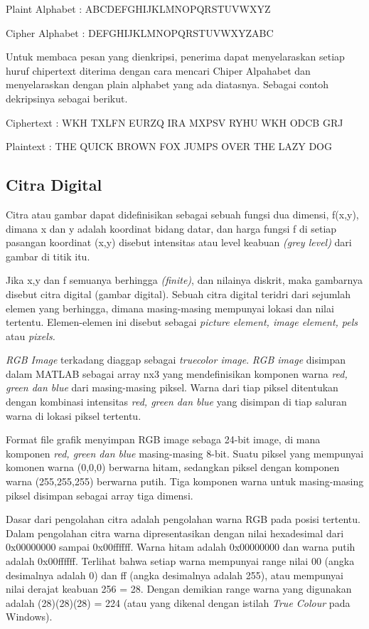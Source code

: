 \documentclass{jtetiproposalskripsi}
\begin{document}
Plaint Alphabet 	 : ABCDEFGHIJKLMNOPQRSTUVWXYZ

Cipher Alphabet	: DEFGHIJKLMNOPQRSTUVWXYZABC

Untuk membaca pesan yang dienkripsi, penerima dapat menyelaraskan setiap huruf chipertext diterima dengan cara mencari Chiper Alpahabet dan menyelaraskan dengan plain alphabet yang ada diatasnya. Sebagai contoh dekripsinya sebagai berikut.
 
Ciphertext	: WKH TXLFN EURZQ IRA MXPSV RYHU WKH ODCB GRJ

Plaintext	 : THE QUICK BROWN FOX JUMPS OVER THE LAZY DOG


\subsection{Citra Digital}
Citra atau gambar dapat didefinisikan sebagai sebuah fungsi dua dimensi, f(x,y), dimana x dan y adalah koordinat bidang datar, dan harga fungsi f di setiap pasangan koordinat (x,y) disebut intensitas atau level keabuan \emph{(grey level)} dari gambar di titik itu.

Jika x,y dan f semuanya berhingga \emph{(finite)}, dan nilainya diskrit, maka gambarnya disebut citra digital (gambar digital).
Sebuah citra digital teridri dari sejumlah elemen yang berhingga, dimana masing-masing mempunyai lokasi dan nilai tertentu. Elemen-elemen ini disebut sebagai \emph{picture element, image element, pels} atau \emph{pixels.}

\emph{RGB Image} terkadang diaggap sebagai \emph{truecolor image}. \emph{RGB image} disimpan dalam MATLAB sebagai array nx3 yang mendefinisikan komponen warna \emph{red, green dan blue} dari masing-masing piksel. Warna dari tiap piksel ditentukan dengan kombinasi intensitas \emph{red, green dan blue} yang disimpan di tiap saluran warna di lokasi piksel tertentu. 

Format file grafik menyimpan RGB image sebaga 24-bit image, di mana komponen \emph{red, green dan blue} masing-masing 8-bit.
Suatu piksel yang mempunyai komonen warna (0,0,0) berwarna hitam, sedangkan piksel dengan komponen warna (255,255,255) berwarna putih. Tiga komponen warna untuk masing-masing piksel disimpan sebagai array tiga dimensi. 

Dasar dari pengolahan citra adalah pengolahan warna RGB pada posisi tertentu. Dalam pengolahan citra warna dipresentasikan dengan nilai hexadesimal dari 0x00000000 sampai 0x00ffffff. Warna hitam adalah 0x00000000 dan warna putih adalah 0x00ffffff. 
 Terlihat bahwa setiap warna mempunyai range nilai 00 (angka desimalnya adalah 0) dan ff (angka desimalnya adalah 255), atau mempunyai nilai derajat keabuan 256 = 28. Dengan demikian range warna yang digunakan adalah (28)(28)(28) = 224 (atau yang dikenal dengan istilah \emph{True Colour} pada Windows).
 
\end{document}
